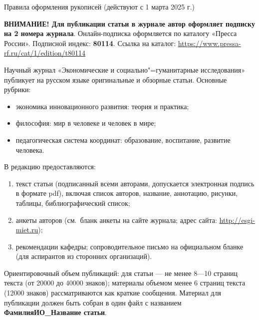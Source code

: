 
\label{authors:start}

\renewcommand{\esgiSecName}{К сведению авторов}

\renewcommand{\esgiSecNameEn}{For the Authors}

\vspace{-1em}
\esgiSection{}{\esgiSecName}

\begin{center}
    Правила оформления рукописей
(действуют с 1 марта 2025 г.)
\end{center}




\begin{multicols}{2}


    \textbf{ВНИМАНИЕ! Для публикации статьи
    в журнале автор оформляет подписку на
    2 номера журнала}. Онлайн-подписка оформляется по каталогу «Пресса России». Подписной индекс: \textbf{80114}. Ссылка на каталог:
    \url{https://www.pressa-rf.ru/cat/1/edition/t80114}

    Научный журнал «Экономические и социально"=гуманитарные исследования» публикует на русском языке оригинальные и обзорные статьи. Основные рубрики:
\begin{itemize}
    \item  экономика инновационного развития:
    теория и практика;
    \item  философия: мир в человеке и человек
    в мире;
    \item  педагогическая система координат: образование, воспитание, развитие человека.
\end{itemize}    

    В редакцию предоставляются:
\begin{enumerate}
    \item текст статьи (подписанный всеми авторами, допускается электронная подпись
    в формате pdf), включая список авторов, название, аннотацию, рисунки, таблицы, библиографический список;
    \item  анкеты авторов (см. бланк анкеты на
    сайте журнала; адрес сайта: \url{http://esgi-miet.ru});
    \item  рекомендации кафедры; сопроводительное письмо на официальном бланке
    (для аспирантов из сторонних организаций).
\end{enumerate}
    Ориентировочный объем публикаций: для
    статьи — не менее 8—10 страниц текста
    (от \num{20000} до \num{40000} знаков); материалы объемом менее 6 страниц текста (\num{12000} знаков)
    рассматриваются как краткие сообщения.
    Материал для публикации должен быть
    собран в один файл с названием \textbf{ФамилияИО\_Название статьи}.


\end{multicols}
